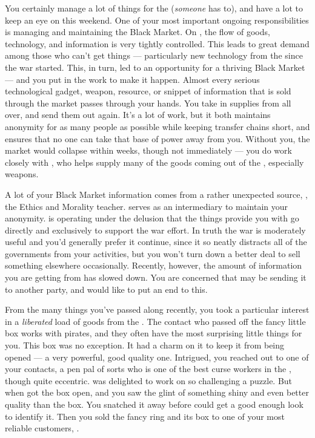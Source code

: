 \documentclass[char]{GL2020}
\begin{document}
You certainly manage a lot of things for the \pGoaties{} (\emph{someone} has to), and have a lot to keep an eye on this weekend. One of your most important ongoing responsibilities is managing and maintaining the Black Market. On \pEarth{}, the flow of goods, technology, and information is very tightly controlled. This leads to great demand among those who can't get things — particularly new technology from the \pTech{} since the war started. This, in turn, led to an opportunity for a thriving Black Market — and you put in the work to make it happen. Almost every serious technological gadget, weapon, resource, or snippet of information that is sold through the market passes through your hands. You take in supplies from all over, and send them out again. It's a lot of work, but it both maintains anonymity for as many people as possible while keeping transfer chains short, and ensures that no one can take that base of power away from you. Without you, the market would collapse within weeks, though not immediately — you do work closely with \cChupInventor{}, who helps supply many of the goods coming out of the \pTech{}, especially weapons. 

A lot of your Black Market information comes from a rather unexpected source, \cEthics{\full}, the Ethics and Morality teacher. \cLibAssist{\full} serves as an intermediary to maintain your anonymity. \cEthics{} is operating under the delusion that the things \cEthics{\they} provide\cEthics{\verbs} you with go directly and exclusively to support the \pShip{} war effort. In truth the war is moderately useful and you'd generally prefer it continue, since it so neatly distracts all of the governments from your activities, but you won't turn down a better deal to sell something elsewhere occasionally. Recently, however, the amount of information you are getting from \cEthics{} has slowed down. You are concerned that \cEthics{\they} may be sending it to another party, and would like to put an end to this.

From the many things you've passed along recently, you took a particular interest in a \emph{liberated} load of goods from the \pFarm{}. The contact who passed off the fancy little box works with pirates, and they often have the most surprising little things for you. This box was no exception. It had a charm on it to keep it from being opened — a very powerful, good quality one. Intrigued, you reached out to one of your contacts, a pen pal of sorts who is one of the best curse workers in the \pFarm{}, though quite eccentric. \cCurse{\full} was delighted to work on so challenging a puzzle. But when \cCurse{\they} got the box open, and you saw the glint of something shiny and even better quality than the box. You snatched it away before \cCurse{} could get a good enough look to identify it. Then you sold the fancy ring and its box to one of your most reliable customers, \cHedonist{\full}.
\end{document}
